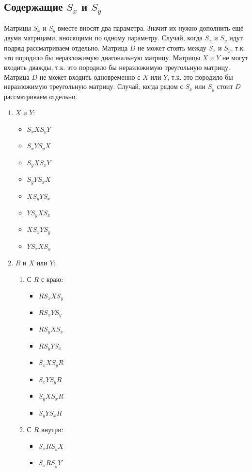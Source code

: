
\subsection{Содержащие $S_x$ и $S_y$}

Матрицы $S_x$ и $S_y$ вместе вносят два параметра. Значит их нужно дополнить ещё двумя матрицами, вносящими по одному параметру.
Случай, когда $S_x$ и $S_y$ идут подряд рассматриваем отдельно.
Матрица $D$ не может стоять между $S_x$ и $S_y$, т.к. это породило бы неразложимую диагональную матрицу.
Матрицы $X$ и $Y$ не могут входить дважды, т.к. это породило бы неразложимую треугольную матрицу.
Матрица $D$ не может входить одновременно с $X$ или $Y$, т.к. это породило бы неразложимую треугольную матрицу.
Случай, когда рядом с $S_x$ или $S_y$ стоит $D$ рассматриваем отдельно.

\begin{enumerate}
	\item $X$ и $Y$:
	\begin{itemize}
		\item $S_x X S_y Y$
		\item $S_x Y S_y X$
		\item $S_y X S_x Y$
		\item $S_y Y S_x X$
		\item $X S_y Y S_x$ 
		\item $Y S_y X S_x$ 
		\item $X S_x Y S_y$ 
		\item $Y S_x X S_y$
	\end{itemize}
	\item $R$ и $X$ или $Y$:
	\begin{enumerate}
		\item С $R$ с краю:
		\begin{itemize}
			\item $R S_x X S_y$
			\item $R S_x Y S_y$
			\item $R S_y X S_x$
			\item $R S_y Y S_x$
			\item $S_x X S_y R$ 
			\item $S_x Y S_y R$ 
			\item $S_y X S_x R$ 
			\item $S_y Y S_x R$
		\end{itemize}
		\item С $R$ внутри:
		\begin{itemize}
			\item $S_x R S_y X$
			\item $S_x R S_y Y$

\end{itemize}
\end{enumerate}
\end{enumerate}
